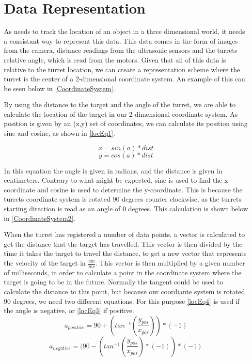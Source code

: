 \section{Data Representation}\label{RepScheme}
As \name needs to track the location of an object in a three dimensional world,
it needs a consistant way to represent this data. This data comes in the form
of images from the camera, distance readings from the ultrasonic sensors and
the turrets relative angle, which is read from the motors. Given that all of
this data is relative to the turret location, we can create a representation
scheme where the turret is the center of a 2-dimensional coordinate system. An
example of this can be seen below in \autoref{CoordinateSystem}.\nl


By using the distance to the target and the angle of the turret, we are able to
calculate the location of the target in our 2-dimensional coordinate system.
As position is given by an (x,y) set of coordinates, we can calculate its
position using sine and cosine, as shown in \autoref{locEq1}.

\begin{equation}\label{locEq1}
x=sin(a)*dist
\end{equation}
\begin{equation}\label{locEq2}
y=cos(a)*dist
\end{equation} 

In this equation the angle  is given in radians, and the distance
 is given in centimeters. Contrary to what might be expected, sine
is used to find the x-coordinate and cosine is used to determine the
y-coordinate. This is because the turrets coordinate system is rotated 90
degrees counter clockwise, as the turrets starting direction is read as an angle
of 0 degrees. This calculation is shown below in \autoref{CoordinateSystem2}.


When the turret has registered a number of data points, a vector is
calculated to get the distance that the target has travelled. This vector is
then divided by the time it takes the target to travel the distance, to get a
new vector that represents the velocity of the target in $\frac{cm}{ms}$. This
vector is then multiplied by a given number of milliseconds, in order to
calculate a point in the coordinate system where the target is going to be in
the future. Normally the tangent could be used to calculate the distance
to this point, but because our coordiante system is rotated 90 degrees, we need two
different equations. For this purpose \autoref{locEq4} is used if the angle is
negative, or \autoref{locEq3} if positive.
\begin{equation}\label{locEq3}
a_{positive}=90+(tan^{-1}(\frac{y_{pos}}{x_{pos}}))*(-1)
\end{equation} 
\begin{equation}\label{locEq4}
a_{negative}=(90-(tan^{-1}(\frac{y_{pos}}{x_{pos}})*(-1))*(-1)
\end{equation} 

